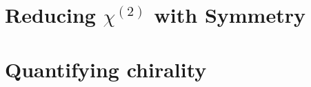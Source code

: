\documentclass[11pt,a4paper,final]{report}
\begin{document}


%


\clearpage

\appendix
\chapter{Reducing \texorpdfstring{$\chi^{(2)}$}{Lg} with Symmetry}\label{sec:appendix:rotations}

\chapter{Quantifying chirality}\label{sec:appendix:QuantifyingChirality}

\end{document}
